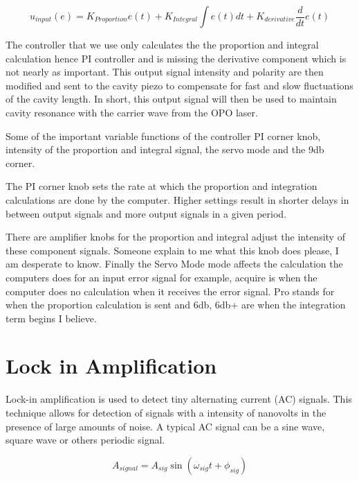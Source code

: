 \documentclass[a4paper]{book}
\begin{document}
			\begin{equation}
				u_{input}(e)=K_{Proportion}e(t)+K_{Integral} \int{e(t)dt} +K_{derivative} \frac{d}{dt}e(t)
			\end{equation}
			
			The controller that we use only calculates the the proportion and integral calculation hence PI controller and is missing the derivative component which is not nearly as important.
			This output signal intensity and polarity are then modified and sent to the cavity piezo to compensate for fast and slow fluctuations of the cavity length. In short, this output signal will then be used to maintain cavity resonance with the carrier wave from the OPO laser. 
			
			Some of the important variable functions of the controller PI corner knob, intensity of the proportion and integral signal, the servo mode and the 9db corner. 
			
			The PI corner knob sets the rate at which the proportion and integration calculations are done by the computer. Higher settings result in shorter delays in between output signals and more output signals in a given period. 
			
			There are amplifier knobs for the proportion and integral adjust the intensity of these component signals. Someone explain to me what this knob does please, I am desperate to know.
			Finally the Servo Mode mode affects the calculation the computers does for an input error signal for example, acquire is when the computer does no calculation when it receives the error signal. Pro stands for when the proportion calculation is sent and 6db, 6db+ are when the integration term begins I believe.
		
	
	
	\section{Lock in Amplification}
		\label{sec:Lock in Amplification}
		Lock-in amplification is used to detect tiny alternating current (AC) signals. This technique allows for detection of signals with a intensity of nanovolts in the presence of large amounts of noise. A typical AC signal can be a sine wave, square wave or others periodic signal.
		
		\begin{equation} \label{eq:signal}
			A_{signal} = A_{sig} \sin({\omega_{sig} t + \phi_{sig}}) 
		\end{equation}
		
\end{document}
